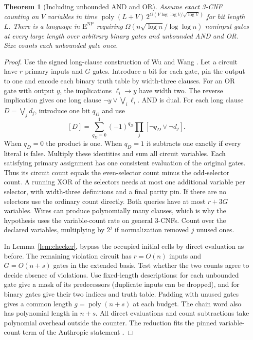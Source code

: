 \documentclass[12pt,letterpaper]{article}
\newtheorem{theorem}{Theorem}
\newcommand{\ENP}{\mathrm{E}^{\mathrm{NP}}}
\begin{document}
\begin{theorem}[Including unbounded AND and OR]\label{thm:unbounded}
Assume exact 3-CNF counting on $V$ variables in time
$\operatorname{poly}(L+V)\,2^{O(V\log\log V/\sqrt{\log V})}$ for
bit length $L$. There is a language in $\ENP$ requiring
$\Omega(n\sqrt{\log n}/\log\log n)$ noninput gates at every large
length over arbitrary binary gates and unbounded AND and OR. Size
counts each unbounded gate once.
\end{theorem}
\begin{proof}
Use the signed long-clause construction of Wu and Wang
\cite[Lemma~7]{wuwang}. Let a circuit have $r$ primary inputs and
$G$ gates. Introduce a bit for each gate, pin the output to one and
encode each binary truth table by width-three clauses. For an OR gate
with output $y$, the implications $\ell_i\to y$ have width two.
The reverse implication gives one long clause
$\neg y\lor\bigvee_i\ell_i$. AND is dual. For each long clause
$D=\bigvee_j d_j$, introduce one bit $q_D$ and use
\[
 [D]=\sum_{q_D=0}^1(-1)^{q_D}\prod_j[\neg q_D\lor\neg d_j].
\]
When $q_D=0$ the product is one. When $q_D=1$ it subtracts one
exactly if every literal is false. Multiply these identities and
sum all circuit variables. Each satisfying primary assignment has
one consistent evaluation of the original gates. Thus its circuit
count equals the even-selector count minus the odd-selector count.
A running XOR of the selectors needs at most one additional variable
per selector, with width-three definitions and a final parity pin.
If there are no selectors use the ordinary count directly. Both
queries have at most $r+3G$ variables. Wires can produce polynomially
many clauses, which is why the hypothesis uses the variable-count
rate on general 3-CNFs. Count over the declared variables, multiplying
by $2^j$ if normalization removed $j$ unused ones.

In Lemma~\ref{lem:checker}, bypass the occupied initial cells by
direct evaluation as before. The remaining violation circuit has
$r=O(n)$ inputs and $G=O(n+s)$ gates in the extended basis. Test
whether the two counts agree to decide absence of violations.
Use fixed-length descriptions: for each unbounded gate give a mask of
its predecessors (duplicate inputs can be dropped), and for binary
gates give their two indices and truth table. Padding with unused
gates gives a common length $g=\operatorname{poly}(n+s)$ at each
budget. The chain word also has polynomial length in $n+s$.
All direct evaluations and count subtractions take polynomial overhead
outside the counter. The reduction fits the pinned variable-count
term of the Anthropic statement \cite{anthropicrate}.


\end{proof}
\end{document}
